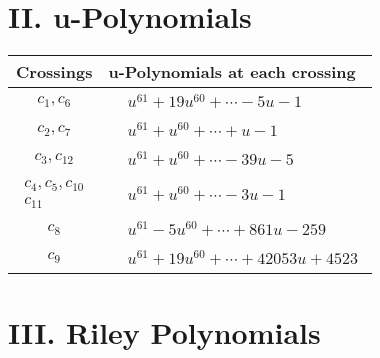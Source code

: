 \documentclass[1p]{elsarticle_modified}
\theoremstyle{definition}
\begin{document}
\newpage\renewcommand{\arraystretch}{1}
\centering \section*{ II. u-Polynomials}
\begin{tabular}{m{50pt}|m{274pt}}
Crossings & \hspace{64pt}u-Polynomials at each crossing \\
\hline $$\begin{aligned}c_{1},c_{6}\end{aligned}$$&$\begin{aligned}
&u^{61}+19 u^{60}+\cdots-5 u-1
\end{aligned}$\\
\hline $$\begin{aligned}c_{2},c_{7}\end{aligned}$$&$\begin{aligned}
&u^{61}+u^{60}+\cdots+u-1
\end{aligned}$\\
\hline $$\begin{aligned}c_{3},c_{12}\end{aligned}$$&$\begin{aligned}
&u^{61}+u^{60}+\cdots-39 u-5
\end{aligned}$\\
\hline $$\begin{aligned}c_{4},c_{5},c_{10}\\c_{11}\end{aligned}$$&$\begin{aligned}
&u^{61}+u^{60}+\cdots-3 u-1
\end{aligned}$\\
\hline $$\begin{aligned}c_{8}\end{aligned}$$&$\begin{aligned}
&u^{61}-5 u^{60}+\cdots+861 u-259
\end{aligned}$\\
\hline $$\begin{aligned}c_{9}\end{aligned}$$&$\begin{aligned}
&u^{61}+19 u^{60}+\cdots+42053 u+4523
\end{aligned}$\\
\hline
\end{tabular}\newpage\renewcommand{\arraystretch}{1}
\centering \section*{ III. Riley Polynomials}
\end{document}
